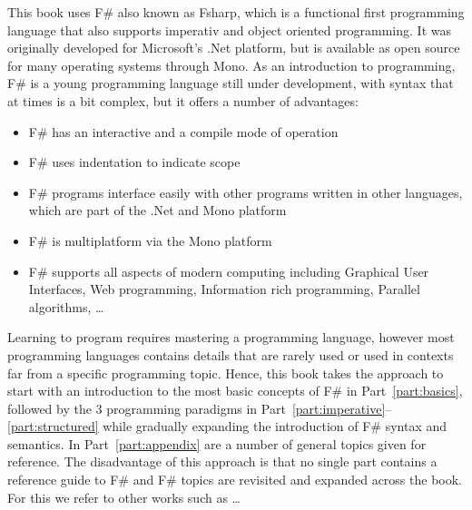 This book uses F\# also known as Fsharp, which is a functional first programming language that also supports imperativ and object oriented programming. It was originally developed for Microsoft's .Net platform, but is available as open source for many operating systems through Mono. As an introduction to programming, F\# is a young programming language still under development, with syntax that at times is a bit complex, but it offers a number of advantages:
\begin{itemize}
\item F\# has an interactive and a compile mode of operation
\item F\# uses indentation to indicate scope
\item F\# programs interface easily with other programs written in other languages, which are part of the .Net and Mono platform
\item F\# is multiplatform via the Mono platform
\item F\# supports all aspects of modern computing including Graphical User Interfaces, Web programming, Information rich programming, Parallel algorithms, \dots
\end{itemize}

Learning to program requires mastering a programming language, however most programming languages contains details that are rarely used or used in contexts far from a specific programming topic. Hence, this book takes the approach to start with an introduction to the most basic concepts of F\# in Part~\ref{part:basics}, followed by the 3 programming paradigms in Part~\ref{part:imperative}--\ref{part:structured} while gradually expanding the introduction of F\# syntax and semantics. In Part~\ref{part:appendix} are a number of general topics given for reference. The disadvantage of this approach is that no single part contains a reference guide to F\# and F\# topics are revisited and expanded across the book. For this we refer to other works such as \dots {}

